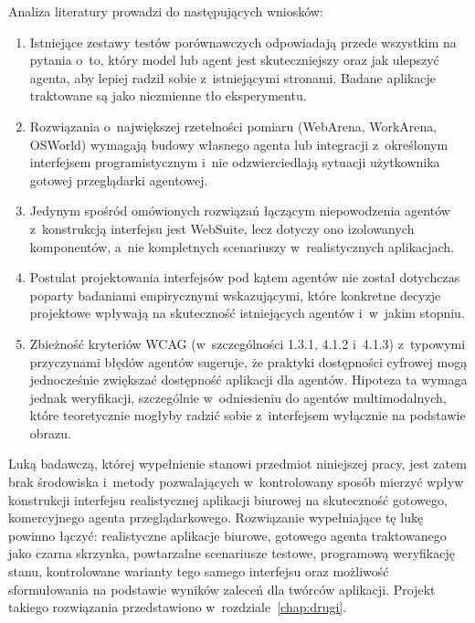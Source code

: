 Analiza literatury prowadzi do następujących wniosków:
\begin{enumerate}
    \item Istniejące zestawy testów porównawczych odpowiadają przede wszystkim na pytania o~to, który model lub agent jest skuteczniejszy oraz jak ulepszyć agenta, aby lepiej radził sobie z~istniejącymi stronami. Badane aplikacje traktowane są jako niezmienne tło eksperymentu.
    \item Rozwiązania o~największej rzetelności pomiaru (WebArena, WorkArena, OSWorld) wymagają budowy własnego agenta lub integracji z~określonym interfejsem programistycznym i~nie odzwierciedlają sytuacji użytkownika gotowej przeglądarki agentowej.
    \item Jedynym spośród omówionych rozwiązań łączącym niepowodzenia agentów z~konstrukcją interfejsu jest WebSuite, lecz dotyczy ono izolowanych komponentów, a~nie kompletnych scenariuszy w~realistycznych aplikacjach.
    \item Postulat projektowania interfejsów pod kątem agentów \citep{lu2025awi} nie został dotychczas poparty badaniami empirycznymi wskazującymi, które konkretne decyzje projektowe wpływają na skuteczność istniejących agentów i~w~jakim stopniu.
    \item Zbieżność kryteriów WCAG (w~szczególności 1.3.1, 4.1.2 i~4.1.3) z~typowymi przyczynami błędów agentów sugeruje, że praktyki dostępności cyfrowej mogą jednocześnie zwiększać dostępność aplikacji dla agentów. Hipoteza ta wymaga jednak weryfikacji, szczególnie w~odniesieniu do agentów multimodalnych, które teoretycznie mogłyby radzić sobie z~interfejsem wyłącznie na podstawie obrazu.
\end{enumerate}

Luką badawczą, której wypełnienie stanowi przedmiot niniejszej pracy, jest zatem brak środowiska i~metody pozwalających w~kontrolowany sposób mierzyć wpływ konstrukcji interfejsu realistycznej aplikacji biurowej na skuteczność gotowego, komercyjnego agenta przeglądarkowego. Rozwiązanie wypełniające tę lukę powinno łączyć: realistyczne aplikacje biurowe, gotowego agenta traktowanego jako czarna skrzynka, powtarzalne scenariusze testowe, programową weryfikację stanu, kontrolowane warianty tego samego interfejsu oraz możliwość sformułowania na podstawie wyników zaleceń dla twórców aplikacji. Projekt takiego rozwiązania przedstawiono w~rozdziale~\ref{chap:drugi}.
